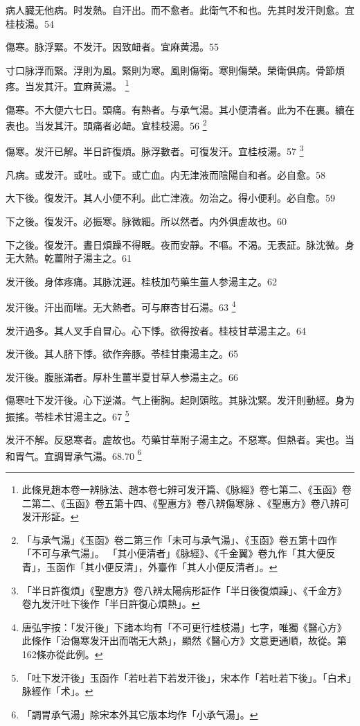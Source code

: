 病人臓无他病。时发熱。自汗出。而不愈者。此衛气不和也。先其时发汗則愈。宜桂枝湯。54

傷寒。脉浮緊。不发汗。因致衄者。宜麻黄湯。55

{\khaaitp 寸口}脉浮而緊。浮則为風。緊則为寒。風則傷衛。寒則傷榮。榮衛俱病。骨節煩疼。当发其汗。{\khaaitp 宜麻黄湯。}
	\footnote{
		此條見趙本卷一辨脉法、趙本卷七辨可发汗篇、《脉經》卷七第二、《玉函》卷二第二、《玉函》卷五第十四、《聖惠方》卷八辨傷寒脉{\sungtpii 𠊱}、《聖惠方》卷八辨可发汗形証。
	}

傷寒。不大便六七日。頭痛。有熱者。与承气湯。其小便清者。此为不在裏。續在表也。当发其汗。頭痛者必衄。宜桂枝湯。56
	\footnote{
		「与承气湯」《玉函》卷二第三作「未可与承气湯」、《玉函》卷五第十四作「不可与承气湯」。
		「其小便清者」《脉經》、《千金翼》卷九作「其大便反青」，玉函作「其小便反清」，外臺作「其人小便反清者」。
	}

傷寒。发汗已解。半日許復煩。脉浮數者。可復发汗。宜桂枝湯。57
	\footnote{
		「半日許復煩」《聖惠方》卷八辨太陽病形証作「半日後復煩躁」、《千金方》卷九发汗吐下後作「半日許復心煩熱」。
	}

凡病。或发汗。或吐。或下。或亡血。{\khaaitp 内}无津液而陰陽自和者。必自愈。58

大下後。復发汗。其人小便不利。此亡津液。勿治之。得小便利。必自愈。59

下之後。復发汗。必振寒。脉微細。所以然者。内外俱虗故也。60

下之後。復发汗。晝日煩躁不得眠。夜而安靜。不嘔。不渴。无表証。脉沈微。身无大熱。乾薑附子湯主之。61

发汗後。身体疼痛。其脉沈遲。桂枝加芍藥生薑人参湯主之。62

发汗後。汗出而喘。无大熱者。可与麻杏甘石湯。63
	\footnote{
		唐弘宇按：「发汗後」下諸本均有「不可更行桂枝湯」七字，唯獨《醫心方》此條作「治傷寒发汗出而喘无大熱」，顯然《醫心方》文意更通順，故從。第162條亦從此例。
	}

发汗過多。其人叉手自冒心。心下悸。欲得按者。桂枝甘草湯主之。64

发汗後。其人脐下悸。欲作奔豚。苓桂甘棗湯主之。65

发汗後。腹胀滿者。厚朴{\khaaitp 生薑半夏甘草人参}湯主之。66

傷寒吐下发汗後。心下逆滿。气上衝胸。起則頭眩。其脉沈緊。发汗則動經。身为振搖。苓桂术甘湯主之。67
	\footnote{
		「吐下发汗後」玉函作「若吐若下若发汗後」，宋本作「若吐若下後」。「白术」脉經作「术」。
	}

发汗不解。反惡寒者。虗故也。芍藥甘草附子湯主之。不惡寒。但熱者。実也。当和胃气。宜調胃承气湯。68.70
	\footnote{
		「調胃承气湯」除宋本外其它版本均作「小承气湯」。
	}

